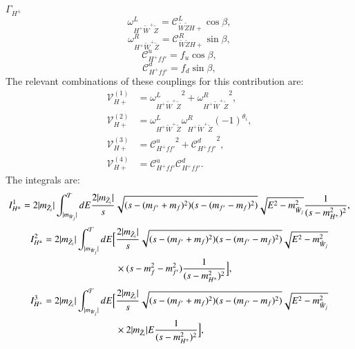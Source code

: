 \documentclass[final,3p,times]{elsarticle}
\begin{document}
\textbf{\underline{$\Gamma_{H^{\pm}}$}}
\begin{equation}
\omega_{H^+ \tilde{W}^+ \tilde{Z}}^L = \mathcal{C}_{\tilde{W} \tilde{Z} H+}^L  \cos\beta,
\end{equation}
\begin{equation}
\omega_{H^+ \tilde{W}^+ \tilde{Z}}^R = \mathcal{C}_{\tilde{W} \tilde{Z} H+}^R  \sin\beta,
\end{equation}
\begin{equation}
\mathcal{C}_{H^+ f f'}^u = f_{u}\cos\beta,
\end{equation}
\begin{equation}
\mathcal{C}_{H^+ f f'}^d = f_{d}\sin\beta,
\end{equation}
The relevant combinations of these couplings for this contribution are:
\begin{align}
\mathcal{V}_{H+}^{(1)} &= {\omega_{H^+ \tilde{W}^+ \tilde{Z}}^L}^2 + {\omega_{H^+ \tilde{W}^+ \tilde{Z}}^R}^2, \\
\mathcal{V}_{H+}^{(2)} &= \omega_{H^+ \tilde{W}^+ \tilde{Z}}^L  \omega_{H^+ \tilde{W}^+ \tilde{Z}}^R  (-1)^{\theta_i}, \\
\mathcal{V}_{H+}^{(3)} &= {\mathcal{C}_{H^+ f f'}^u}^2 + {\mathcal{C}_{H^+ f f'}^d}^2, \\
\mathcal{V}_{H+}^{(4)} &= \mathcal{C}_{H^+ f f'}^u  \mathcal{C}_{H^+ f f'}^d.
\end{align}
The integrals are:
\begin{equation}  \label{IHpm1}
I_{H^{\pm}}^{1} = 2|m_{\tilde{Z}_i}| \int_{|m_{\tilde{W}_{j}}|}^{\mathcal{T}} dE {2|m_{\tilde{Z}_i}| \over s} \sqrt{(s-(m_{f'}+m_{f})^2)(s-(m_{f'}-m_{f})^2)} \sqrt{E^2 - m_{\tilde{W}_j}^2}{1 \over (s - m_{H^{\pm}}^2)^2},
\end{equation}
\begin{equation} \label{IHpm2}
\begin{aligned}
I_{H^{\pm}}^{2} = 2|m_{\tilde{Z}_i}| \int_{|m_{\tilde{W}_{j}}|}^{\mathcal{T}} dE \Big[ &{2|m_{\tilde{Z}_i}| \over s} \sqrt{(s-(m_{f'}+m_{f})^2)(s-(m_{f'}-m_{f})^2)} \sqrt{E^2 - m_{\tilde{W}_j}^2} \\ & \times (s-m_{f}^2 - m_{f'}^2){1 \over (s - m_{H^{\pm}}^2)^2}\Big],
\end{aligned}
\end{equation}
\begin{equation} \label{IHpm3}
\begin{aligned}
I_{H^{\pm}}^{3} = 2|m_{\tilde{Z}_i}| \int_{|m_{\tilde{W}_{j}}|}^{\mathcal{T}} dE \Big[ &{2|m_{\tilde{Z}_i}| \over s} \sqrt{(s-(m_{f'}+m_{f})^2)(s-(m_{f'}-m_{f})^2)} \sqrt{E^2 - m_{\tilde{W}_j}^2} \\ & \times 2|m_{\tilde{Z}_i}|E{1 \over (s - m_{H^{\pm}}^2)^2}\Big],
\end{aligned}
\end{equation}
\end{document}
